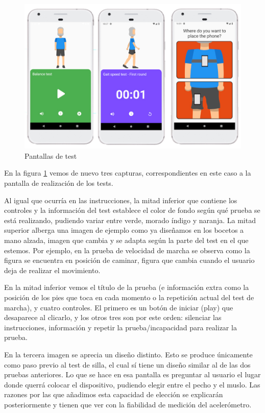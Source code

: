 \begin{figure}[H]
	\centering
	\includegraphics[scale=0.4]{imagenes/capturas_test.jpg}
	\caption{Pantallas de test\label{fig:capturas_test}}
\end{figure}

En la figura \ref{fig:capturas_test} vemos de nuevo tres capturas, correspondientes en este caso a la pantalla de realización de los tests.

Al igual que ocurría en las instrucciones, la mitad inferior que contiene los controles y la información del test establece el color de fondo según qué prueba se está realizando, pudiendo variar entre verde, morado índigo y naranja. La mitad superior alberga una imagen de ejemplo como ya diseñamos en los bocetos a mano alzada, imagen que cambia y se adapta según la parte del test en el que estemos. Por ejemplo, en la prueba de velocidad de marcha se observa como la figura se encuentra en posición de caminar, figura que cambia cuando el usuario deja de realizar el movimiento. 

En la mitad inferior vemos el título de la prueba (e información extra como la posición de los pies que toca en cada momento o la repetición actual del test de marcha), y cuatro controles. El primero es un botón de iniciar (play) que desaparece al clicarlo, y los otros tres son por este orden: silenciar las instrucciones, información y repetir la prueba/incapacidad para realizar la prueba.

En la tercera imagen se aprecia un diseño distinto. Esto se produce únicamente como paso previo al test de silla, el cual sí tiene un diseño similar al de las dos pruebas anteriores. Lo que se hace en esa pantalla es preguntar al usuario el lugar donde querrá colocar el dispositivo, pudiendo elegir entre el pecho y el muslo. Las razones por las que añadimos esta capacidad de elección se explicarán posteriormente y tienen que ver con la fiabilidad de medición del acelerómetro.

